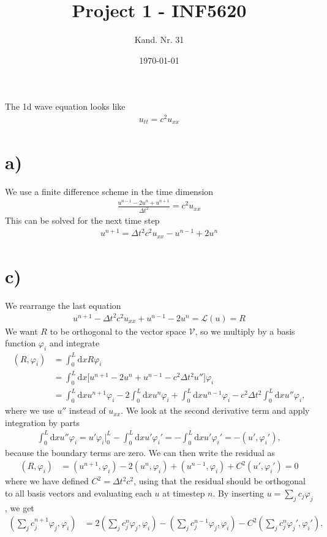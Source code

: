 \documentclass[a4paper,10pt]{article}
\title{Project 1 - INF5620}
\date{\today}
\author{Kand. Nr. 31}
\renewcommand{\(}{\left(}
\renewcommand{\)}{\right)}
\newcommand{\dm}[1]{\text{d}#1}
\newcommand{\f}[2]{\frac{#1}{#2}}
\begin{document}
The 1d wave equation looks like
\begin{align*}
  u_{tt} = c^2 u_{xx}
\end{align*}
\section*{a)}
We use a finite difference scheme in the time dimension
\begin{align*}
  \f{u^{n-1} - 2u^n + u^{n+1}}{\Delta t^2} = c^2u_{xx}
\end{align*}
This can be solved for the next time step
\begin{align*}
  u^{n+1} = \Delta t^2c^2u_{xx} - u^{n-1} + 2u^n
\end{align*}
\section*{c)}
We rearrange the last equation 
\begin{align*}
  u^{n+1} -\Delta t^2c^2u_{xx} + u^{n-1} - 2u^n = \mathcal L(u) = R
\end{align*}
We want $R$ to be orthogonal to the vector space $\mathcal V$, so we multiply by a basis function $\varphi_i$ and integrate
\begin{align*}
  (R,\varphi_i) &= \int_0^L \dm x R\varphi_i\\
  &= \int_0^L \dm x \Big[u^{n+1} - 2u^n + u^{n-1} - c^2\Delta t^2 u''\Big]\varphi_i\\
  &= \int_0^L \dm x u^{n+1}\varphi_i - 2\int_0^L \dm x u^{n}\varphi_i + \int_0^L \dm x u^{n-1}\varphi_i - c^2\Delta t^2\int_0^L \dm x u''\varphi_i,
\end{align*}
where we use $u''$ instead of $u_{xx}$. We look at the second derivative term and apply integration by parts
\begin{align*}
  \int_0^L \dm x u''\varphi_i = u'\varphi_i\Big|^L_0 - \int_0^L \dm x u'\varphi_i' = -\int_0^L \dm x u'\varphi_i' = -(u',\varphi_i'),
\end{align*}
because the boundary terms are zero. We can then write the residual as
\begin{align*}
  (R,\varphi_i) &= (u^{n+1},\varphi_i) - 2(u^{n},\varphi_i) + (u^{n-1},\varphi_i) + C^2(u',\varphi_i') = 0
\end{align*}
where we have defined $C^2=\Delta t^2c^2$, using that the residual should be orthogonal to all basis vectors and evaluating each $u$ at timestep $n$. By inserting $u=\sum_j c_j \varphi_j$, we get
\begin{align*}
  (\sum_j c_j^{n+1}\varphi_j,\varphi_i) &= 2(\sum_j c_j^n\varphi_j,\varphi_i) - (\sum_j c_j^{n-1}\varphi_j,\varphi_i) - C^2(\sum_j c_j^n\varphi_j',\varphi_i').
\end{align*}
\end{document}
